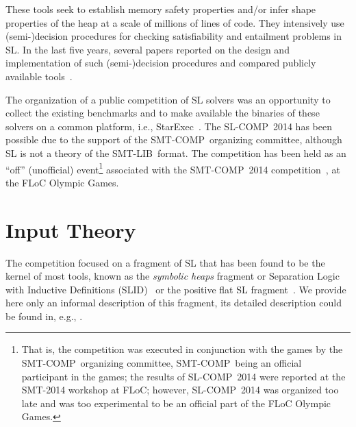 \documentclass[twoside,11pt]{article}
\newcommand{\SLRD}{\textsc{SLID}}
\newcommand{\smtlib}{\textsf{SMT-LIB}}
\newcommand{\smtcomp}{\textsf{SMT-COMP}}
\newcommand{\slcomp}{\textsf{SL-COMP}}
\newcommand{\starexec}{\textsf{StarExec}}
\begin{document}
These tools seek to establish memory safety properties and/or infer shape properties of the heap at a scale of millions of lines of code.
They intensively use (semi-)decision procedures for checking satisfiability and entailment problems in SL.
In the last five years, several papers reported on the design and implementation of such (semi-)decision procedures and compared publicly available tools~\cite{HasseIOP13}.

The organization of a public competition of SL solvers was an opportunity 
to collect the existing benchmarks and  
to make available the binaries of these solvers on a common platform, i.e., \starexec~\cite{StarExecsite}.
The \slcomp\ 2014 has been possible due to the support of the \smtcomp\ organizing committee, 
although SL is not a theory of the \smtlib\ format.
The competition has been held as an ``off'' (unofficial) event\footnote{That is, the competition was executed in conjunction with the games by the \smtcomp\ organizing committee, \smtcomp\ being an official participant in the games; the results of \slcomp\ 2014 were reported at the SMT-2014 workshop at FLoC; however, \slcomp\ 2014 was organized too late and was too experimental to be an official part of the FLoC Olympic Games.}
associated with the \smtcomp\ 2014 competition~\cite{SMTCOMPsite}, at the FLoC Olympic Games.


\section{Input Theory}
\label{sec:SL}

The competition focused on a fragment of SL that has been found to be the kernel of most tools, known 
as
the \emph{symbolic heaps} fragment
or Separation Logic with Inductive Definitions (\SLRD)~\cite{IosifRS13} or
the positive flat SL fragment~\cite{AntonopoulosGHKO14}. 
We provide here only an informal description of this fragment, its detailed description could be found in, e.g., \cite{Reynolds02,IosifRS13,AntonopoulosGHKO14}.  
\end{document}
